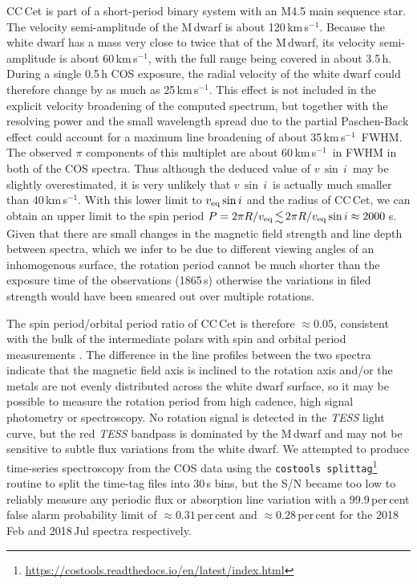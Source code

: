 \documentclass[fleqn,usenatbib]{mnras}
\newcommand{\vsini}{\ensuremath{v\,\sin\,i}}
\newcommand{\kms}{km\,s$^{-1}$}
\begin{document}
CC\,Cet is part of a short-period binary system with an M4.5 main sequence star. The velocity semi-amplitude of the M\,dwarf is about 120\,\kms \citep{safferetal93-1}. Because the white dwarf has a mass very close to twice that of the M\,dwarf, its velocity semi-amplitude is about 60\,\kms, with the full range being covered in about 3.5\,h. During a single 0.5\,h COS exposure, the radial velocity of the white dwarf could therefore change by as much as 25\,\kms. This effect is not included in the explicit velocity broadening of the computed spectrum, but together with the resolving power and the small wavelength spread due to the partial Paschen-Back effect could account for a maximum line broadening of about 35\,\kms\ FWHM. The observed $\pi$ components of this multiplet are about 60\,\kms\ in FWHM in both of the COS spectra. Thus although the deduced value of \vsini\ may be slightly overestimated, it is very unlikely that \vsini\ is actually much smaller than 40\,\kms. With this lower limit to $v_{\rm eq} \sin i$ and the radius of CC\,Cet, we can obtain an upper limit to the spin period $P = 2 \pi R/v_{\rm eq} \la 2 \pi R/v_{\rm eq} \sin i \approx 2000$\,s. Given that there are small changes in the magnetic field strength and line depth between spectra, which we infer to be due to different viewing angles of an inhomogenous surface, the rotation period cannot be much shorter than the exposure time of the observations (1865\,s) otherwise the variations in filed strength would have been smeared out over multiple rotations. 

The spin period/orbital period ratio of CC\,Cet is therefore $\approx0.05$, consistent with the bulk of the intermediate polars with spin and orbital period measurements \citep{bernardinietal17-1}. The difference in the line profiles between the two spectra indicate that the magnetic field axis is inclined to the rotation axis and/or the metals are not evenly distributed across the white dwarf surface, so it may be possible to measure the rotation period from high cadence, high signal photometry or spectroscopy. No rotation signal is detected in the \textit{TESS} light curve, but the red \textit{TESS} bandpass is dominated by the M\,dwarf and may not be sensitive to subtle flux variations from the white dwarf. We attempted to produce time-series spectroscopy from the COS data using the \texttt{costools splittag}\footnote{\url{https://costools.readthedocs.io/en/latest/index.html}} routine to split the time-tag files into 30\,s bins, but the S/N became too low to reliably measure any periodic flux or absorption line variation with a 99.9\,per\,cent false alarm probability limit of $\approx0.31$\,per\,cent and $\approx0.28$\,per\,cent for the 2018\,Feb and 2018\,Jul spectra respectively.     
\end{document}
